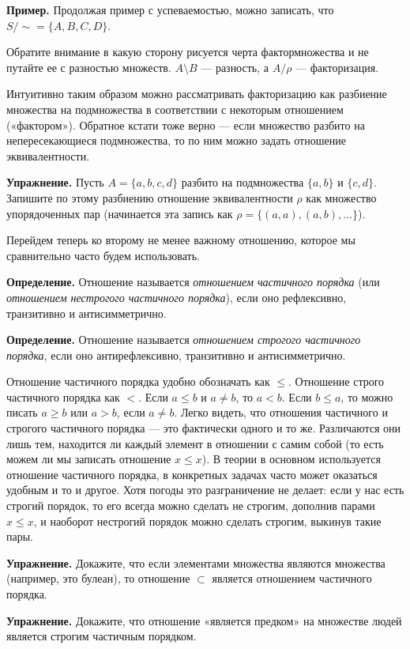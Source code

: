 {\bfseries Пример.} Продолжая пример с успеваемостью, можно записать, что $S/\sim = \{A, B, C, D\}$.

Обратите внимание в какую сторону рисуется черта фактормножества и не путайте ее с разностью множеств. $A\setminus B$ — разность, а $A/\rho$ — факторизация.

Интуитивно таким образом можно рассматривать факторизацию как разбиение множества на подмножества в соответствии с некоторым отношением («фактором»). Обратное кстати тоже верно — если множество разбито на непересекающиеся подмножества, то по ним можно задать отношение эквивалентности.

{\bfseries Упражнение.} Пусть $A = \{a, b, c, d\}$ разбито на подмножества $\{a, b\}$ и $\{c, d\}$. Запишите по этому разбиению отношение эквивалентности $\rho$ как множество упорядоченных пар (начинается эта запись как $\rho = \{(a, a), (a, b), \ldots\}$).

Перейдем теперь ко второму не менее важному отношению, которое мы сравнительно часто будем использовать.

{\bfseries Определение.} Отношение называется {\slshape отношением частичного порядка} (или {\slshape отношением нестрогого частичного порядка}), если оно рефлексивно, транзитивно и антисимметрично.

{\bfseries Определение.} Отношение называется {\slshape отношением строгого частичного порядка}, если оно антирефлексивно, транзитивно и антисимметрично.

Отношение частичного порядка удобно обозначать как $\le$. Отношение строго частичного порядка как $<$. Если $a \le b$ и $a \not= b$, то $a<b$. Если $b \le a$, то можно писать $a \ge b$ или $a > b$, если $a\not= b$. Легко видеть, что отношения частичного и строгого частичного порядка — это фактически одного и то же. Различаются они лишь тем, находится ли каждый элемент в отношении с самим собой (то есть можем ли мы записать отношение $x\le x$). В теории в основном используется отношение частичного порядка, в конкретных задачах часто может оказаться удобным и то и другое. Хотя погоды это разграничение не делает: если у нас есть строгий порядок, то его всегда можно сделать не строгим, дополнив парами $x\le x$, и наоборот нестрогий порядок можно сделать строгим, выкинув такие пары.

{\bfseries Упражнение.} Докажите, что если элементами множества являются множества (например, это булеан), то отношение $\subset$ является отношением частичного порядка.

{\bfseries Упражнение.} Докажите, что отношение «является предком» на множестве людей является строгим частичным порядком.

